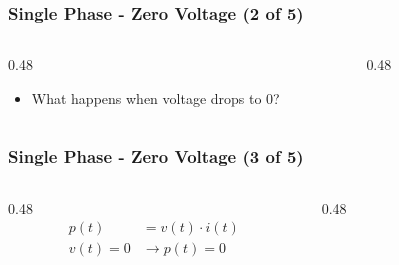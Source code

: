 \begin{frame}
    \frametitle{Single Phase - Zero Voltage (2 of 5)}

    \begin{columns}
        \begin{column}{0.48\linewidth}
            \begin{itemize}
                \item{What happens when voltage drops to 0?}
            \end{itemize}
        \end{column}
        \begin{column}{0.48\linewidth}
            \begin{figure}
                \centering
                \resizebox{\columnwidth}{!}{
                    
                }
            \end{figure}
        \end{column}
    \end{columns}
\end{frame}

\begin{frame}
    \frametitle{Single Phase - Zero Voltage (3 of 5)}

    \begin{columns}
        \begin{column}{0.48\linewidth}
            \[            
                \begin{aligned}
                    p(t) &= v(t) \cdot i(t) \\
                    v(t) = 0 &\rightarrow p(t) = 0
                \end{aligned}
            \]
        \end{column}
        \begin{column}{0.48\linewidth}
            \begin{figure}
                \centering
                \resizebox{\columnwidth}{!}{
                    
                }
            \end{figure}
        \end{column}
    \end{columns}
\end{frame}

